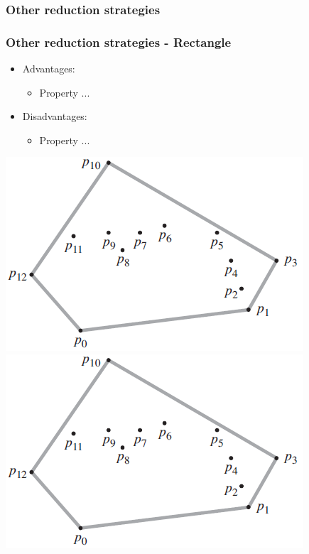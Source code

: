 \subsubsection{Other reduction strategies}
\begin{frame}
\frametitle{Other reduction strategies - Rectangle}
\begin{multicols}{2}
	\begin{itemize}
		\item Advantages:
		\begin{itemize}
			\item Property ...
		\end{itemize}
		\item Disadvantages:
		\begin{itemize}
			\item Property ...
		\end{itemize}
	\end{itemize}
\columnbreak
	\begin{center}
		\includegraphics[scale=0.5]{graphics/convexHull-example}\\
		\includegraphics[scale=0.5]{graphics/convexHull-example}
	\end{center}
\end{multicols}
\end{frame}
